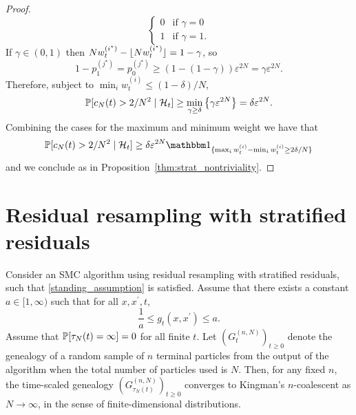 \begin{proof}
\begin{equation*}
\begin{cases}
    0 & \text{if } \gamma = 0 \\
    1 & \text{if } \gamma = 1 .
\end{cases}
\end{equation*}
If $\gamma \in (0,1)$ then
$N w_t^{(i^\star)} - \flnw[i^\star] = 1- \gamma$, so
\begin{equation*}
1 - p_1^{(j^\star)}
= p_0^{(j^\star)}
\geq ( 1- (1-\gamma) ) \varepsilon^{2N}
= \gamma \varepsilon^{2N} .
\end{equation*}
Therefore, subject to $\min_i w_t^{(i)} \leq (1-\delta)/N$,
\begin{equation*}
\Prob[ c_N(t) > 2/N^2 \mid \mathcal{H}_t ]
\geq \min_{\gamma \geq \delta} 
        \left\{ \gamma \varepsilon^{2N} %
        \right\}
= \delta \varepsilon^{2N} .
\end{equation*}
Combining the cases for the maximum and minimum weight we have that
\begin{equation*}
\Prob[ c_N(t) > 2/N^2 \mid \mathcal{H}_t ] 
\geq \delta \varepsilon^{2N} \I{ \max_i w_t^{(i)} - \min_i w_t^{(i)} \geq 2\delta/N }
\end{equation*}
and we conclude as in Proposition~\ref{thm:strat_nontriviality}.
\end{proof}




\section{Residual resampling with stratified residuals \seb{$\checkmark$} }

\begin{corollary}\label{thm:residual_stratified}
Consider an SMC algorithm using residual resampling with stratified residuals, such that \ref{standing_assumption} is satisfied.
Assume that there exists a constant $a\in [1,\infty)$ such that for all $x, x^\prime, t$,
\begin{equation*}
\frac{1}{a} \leq g_t(x, x^\prime) \leq a .
\end{equation*}
Assume that $\Prob[ \tau_N(t) = \infty] =0$ for all finite $t$.
Let $(G_t^{(n,N)})_{t\geq0}$ denote the genealogy of a random sample of $n$ terminal particles from the output of the algorithm when the total number of particles used is $N$. Then, for any fixed $n$, the time-scaled genealogy $(G_{\tau_N(t)}^{(n,N)})_{t\geq0}$ converges to Kingman's $n$-coalescent as $N\to \infty$, in the sense of finite-dimensional distributions.
\end{corollary}

